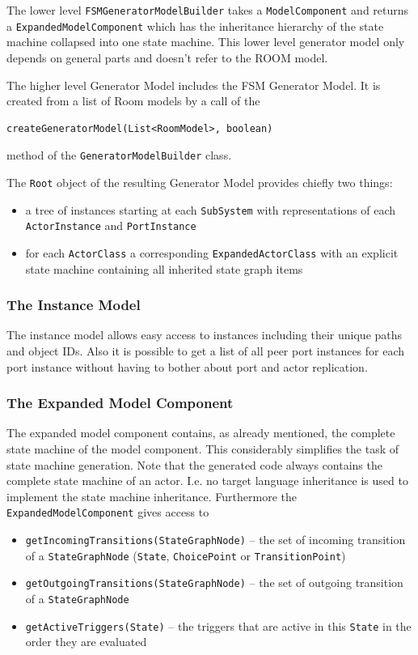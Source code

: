 The lower level \texttt{FSMGeneratorModelBuilder} takes a \texttt{ModelComponent} and returns a \texttt{ExpandedModelComponent} which
has the inheritance hierarchy of the state machine collapsed into one state machine.
This lower level generator model only depends on general parts and doesn't refer to the ROOM model.

The higher level Generator Model includes the FSM Generator Model.
It is created from a list of Room models by a call of the

\begin{verbatim}createGeneratorModel(List<RoomModel>, boolean)\end{verbatim}

method of the \texttt{GeneratorModelBuilder} class.

The \texttt{Root} object of the resulting Generator Model provides chiefly two things:
\begin{itemize}
\item a tree of instances starting at each \texttt{SubSystem} with representations of each 
\texttt{ActorInstance} and \texttt{PortInstance}
\item for each \texttt{ActorClass} a corresponding \texttt{ExpandedActorClass} with an explicit state 
machine containing all inherited state graph items
\end{itemize}

\subsubsection*{The Instance Model}

The instance model allows easy access to instances including their unique paths and object IDs. Also it is 
possible to get a list of all peer port instances for each port instance without having to bother about 
port and actor replication.

\subsubsection*{The Expanded Model Component}

The expanded model component contains, as already mentioned, the complete state machine of the model component. 
This considerably simplifies the task of state machine generation. Note that the generated code always 
contains the complete state machine of an actor. I.e. no target language inheritance is used to implement 
the state machine inheritance.
Furthermore the \texttt{ExpandedModelComponent} gives access to
\begin{itemize}
\item \texttt{getIncomingTransitions(StateGraphNode)} -- the set of incoming transition of a 
\texttt{StateGraphNode} (\texttt{State}, \texttt{ChoicePoint} or \texttt{TransitionPoint})
\item \texttt{getOutgoingTransitions(StateGraphNode)} -- the set of outgoing transition of a 
\texttt{StateGraphNode}
\item \texttt{getActiveTriggers(State)} -- the triggers that are active in this \texttt{State} in the 
order they are evaluated
\end{itemize}

